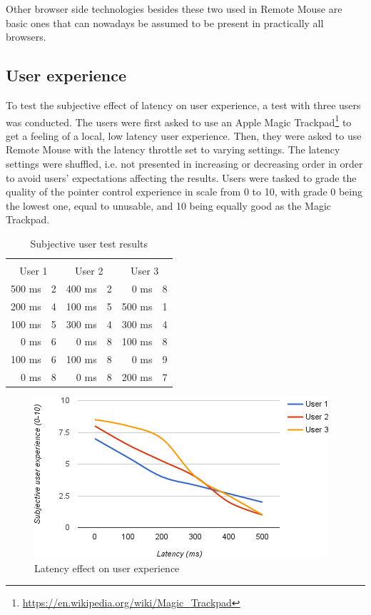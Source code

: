 \documentclass[a4paper,english,twocolumn,9pt]{extarticle}
\newcommand*\rot{\rotatebox{90}}
\begin{document}
Other browser side technologies besides these two used in Remote Mouse
are basic ones that can nowadays be assumed to be present in
practically all browsers.

\subsection*{User experience}

To test the subjective effect of latency on user experience, a test
with three users was conducted. The users were first asked to use an
Apple Magic
Trackpad\footnote{\url{https://en.wikipedia.org/wiki/Magic_Trackpad}}
to get a feeling of a local, low latency user experience. Then, they
were asked to use Remote Mouse with the latency throttle set to
varying settings. The latency settings were shuffled, i.e. not
presented in increasing or decreasing order in order to avoid users'
expectations affecting the results. Users were tasked to grade the
quality of the pointer control experience in scale from 0 to 10, with
grade 0 being the lowest one, equal to unusable, and 10 being equally
good as the Magic Trackpad.

\begin{table} \centering
  \begin{tabular}{rlrlrl}
    \rot{Latency} & \rot{Grade} & \rot{Latency} & \rot{Grade} & \rot{Latency} & \rot{Grade} \\
    \multicolumn{2}{c}{User 1} & \multicolumn{2}{c}{User 2} & \multicolumn{2}{c}{User 3} \\
    \hline
    500 ms & 2  & 400 ms & 2  & 0 ms   & 8 \\
    200 ms & 4  & 100 ms & 5  & 500 ms & 1 \\
    100 ms & 5  & 300 ms & 4  & 300 ms & 4 \\
      0 ms & 6    & 0 ms & 8  & 100 ms & 8 \\
    100 ms & 6  & 100 ms & 8  & 0 ms   & 9 \\
      0 ms & 8    & 0 ms & 8  & 200 ms & 7 \\
    \hline
  \end{tabular}
  \caption{Subjective user test results}
  \label{table:userresults}
\end{table}

\begin{figure}[htb]
  \begin{center}
    \includegraphics[scale=0.4]{latency}
    \caption{Latency effect on user experience}
    \label{fig:userlatency}
  \end{center}
\end{figure}
\end{document}
